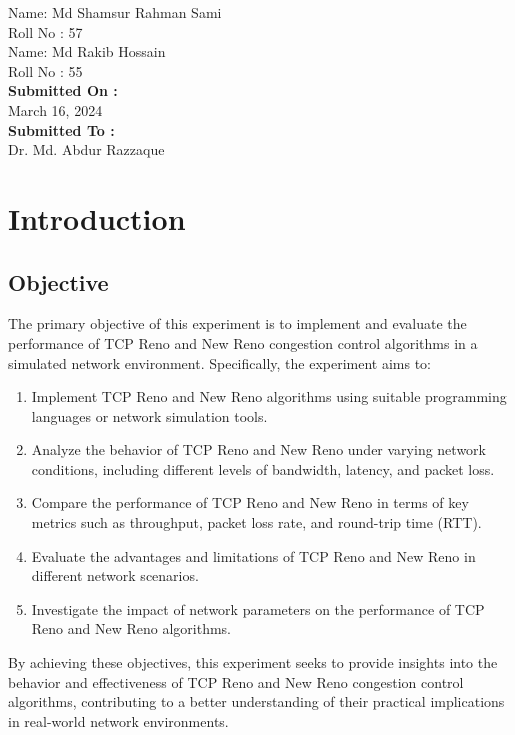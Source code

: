 \documentclass[11pt]{article}
\begin{document}
\begin{titlepage}
\begin{large}
            Name: Md Shamsur Rahman Sami\\[5pt]
            Roll No : 57\\[7pt]
            Name: Md Rakib Hossain\\[5pt]
            Roll No : 55\\[12pt]
        \textbf{Submitted On : \\[12pt]}
            March 16, 2024\\[20pt]
        \textbf{Submitted To :\\[12pt]}
            Dr. Md. Abdur Razzaque\\[12pt]
    \end{large}
\end{titlepage}

\tableofcontents  

\newpage

\section{Introduction}

\subsection{Objective}

The primary objective of this experiment is to implement and evaluate the performance of TCP Reno and New Reno congestion control algorithms in a simulated network environment. Specifically, the experiment aims to:

\begin{enumerate}
    \item Implement TCP Reno and New Reno algorithms using suitable programming languages or network simulation tools.
    \item Analyze the behavior of TCP Reno and New Reno under varying network conditions, including different levels of bandwidth, latency, and packet loss.
    \item Compare the performance of TCP Reno and New Reno in terms of key metrics such as throughput, packet loss rate, and round-trip time (RTT).
    \item Evaluate the advantages and limitations of TCP Reno and New Reno in different network scenarios.
    \item Investigate the impact of network parameters on the performance of TCP Reno and New Reno algorithms.
\end{enumerate}

By achieving these objectives, this experiment seeks to provide insights into the behavior and effectiveness of TCP Reno and New Reno congestion control algorithms, contributing to a better understanding of their practical implications in real-world network environments.
\end{document}
